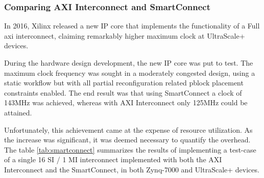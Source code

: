 \subsubsection{Comparing AXI Interconnect and SmartConnect}

In 2016, Xilinx released a new IP core that implements 
the functionality of a Full \gls{axi} interconnect,
claiming remarkably higher maximum clock at UltraScale+ devices.

During the hardware design development, the new IP core was put to test.
The maximum clock frequency was sought in a moderately congested design,
using a static workflow but with all partial reconfiguration related 
\gls{pblock} placement constraints enabled. The end result was that
using SmartConnect a clock of 143MHz was achieved, whereas with
AXI Interconnect only 125MHz could be attained.

Unfortunately, this achievement came at the expense of resource utilization.
As the increase was significant, it was deemed necessary to quantify the overhead.
The table \ref{tab:smartconnect} summarizes the results of implementing 
a test-case of a single 16 SI / 1 MI interconnect implemented with both the 
AXI Interconnect and the SmartConnect, in both Zynq-7000 and UltraScale+ devices.

